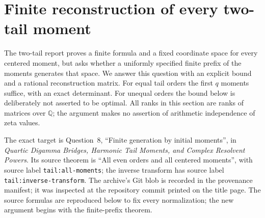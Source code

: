\section{Finite reconstruction of every two-tail moment}
\label{tr:section}

The two-tail report proves a finite formula and a fixed coordinate space
for every centered moment, but asks whether a uniformly specified finite
prefix of the moments generates that space. We answer this question with
an explicit bound and a rational reconstruction matrix. For equal tail
orders the first $q$ moments suffice, with an exact determinant. For
unequal orders the bound below is deliberately not asserted to be optimal.
All ranks in this section are ranks of matrices over $\mathbb Q$; the
argument makes no assertion of arithmetic independence of zeta values.

The exact target is Question~8, ``Finite generation by initial moments'',
in \emph{Quartic Digamma Bridges, Harmonic Tail Moments, and Complex Resolvent Powers}. Its source theorem is
``All even orders and all centered moments'', with source label
\texttt{tail:all-moments}; the inverse transform has source label
\texttt{tail:inverse-transform}. The archive's Git blob is recorded
in the provenance manifest; it was inspected at the repository
commit printed on the title page.
The source formulas are reproduced below to fix every normalization;
the new argument begins with the finite-prefix theorem.


